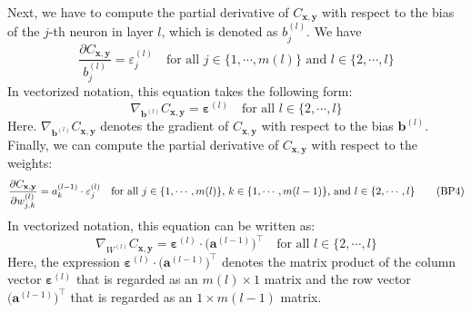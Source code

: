 Next, we have to compute the partial derivative of $C_{\mathbf{x}, \mathbf{y}}$ with respect to the bias of the
$j$-th neuron in layer $l$, which is denoted as $b_j^{(l)}$.  We have
\begin{equation}
  \label{eq:BP3}
  \frac{\partial C_{\mathbf{x}, \mathbf{y}}}{b_j^{(l)}} = \varepsilon_j^{(l)}
  \quad \mbox{for all $j \in \{1,\cdots,m(l)\}$ and $l \in \{2, \cdots,l\}$}
  \tag{BP3}
\end{equation}
In vectorized notation, this equation takes the following form:
\begin{equation}
  \label{eq:BP3v}
  \nabla_{\mathbf{b}^{(l)}} C_{\mathbf{x}, \mathbf{y}} = \boldsymbol{\varepsilon}^{(l)}
  \quad \mbox{for all $l \in \{2, \cdots,l\}$}
  \tag{BP3v}
\end{equation}
Here. $\nabla_{\mathbf{b}^{(l)}} C_{\mathbf{x}, \mathbf{y}}$ denotes the gradient of $C_{\mathbf{x},
  \mathbf{y}}$ with respect to the bias $\mathbf{b}^{(l)}$.
Finally, we can compute the  partial derivative of $C_{\mathbf{x}, \mathbf{y}}$ with respect to the weights:
\begin{equation}
  \label{eq:BP4}
  \frac{\partial C_{\mathbf{x}, \mathbf{y}}}{\partial w_{j,k}^{(l)}} = a_k^{(l-1)} \cdot \varepsilon_j^{(l)}
  \quad \mbox{for all $j \in \{1,\cdots,m(l)\}$, $ k \in \{1,\cdots,m(l-1)\}$, and $l \in \{2, \cdots,l\}$}
  \tag{BP4}
\end{equation}
In vectorized notation, this equation can be written as:
\begin{equation}
  \label{eq:BP4v}
  \nabla_{W^{(l)}} C_{\mathbf{x}, \mathbf{y}} = \boldsymbol{\varepsilon}^{(l)} \cdot \bigl(\mathbf{a}^{(l-1)}\bigr)^\top
  \quad \mbox{for all $l \in \{2, \cdots,l\}$}
  \tag{BP4v}
\end{equation}
Here, the expression $\boldsymbol{\varepsilon}^{(l)} \cdot \bigl(\mathbf{a}^{(l-1)}\bigr)^\top$ denotes the matrix
product of the column vector $\boldsymbol{\varepsilon}^{(l)}$ that is regarded as an $m(l) \times 1$ matrix and the
row vector $\bigl(\mathbf{a}^{(l-1)}\bigr)^\top$ that is regarded as an $1 \times m(l-1)$ matrix.

